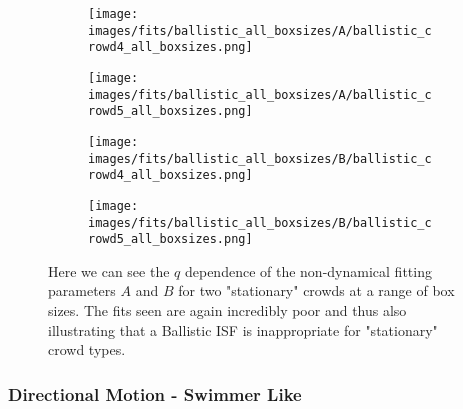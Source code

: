 \documentclass[10pt]{article}
\begin{document}
\begin{figure}[H]
\begin{subfigure}[t]{.5\textwidth}
  \centering
 \texttt{[image: images/fits/ballistic\_all\_boxsizes/A/ballistic\_crowd4\_all\_boxsizes.png]}
  \caption{}
\end{subfigure}%
\hfill
\begin{subfigure}[t]{.5\textwidth}
  \centering
  \texttt{[image: images/fits/ballistic\_all\_boxsizes/A/ballistic\_crowd5\_all\_boxsizes.png]}
  \caption{}
\end{subfigure}
\label{fig:crowd_ballistic_fits_A_all_boxsizes}
\par\bigskip
\begin{subfigure}[t]{.5\textwidth}
  \centering
 \texttt{[image: images/fits/ballistic\_all\_boxsizes/B/ballistic\_crowd4\_all\_boxsizes.png]}
  \caption{}
\end{subfigure}%
\hfill
\begin{subfigure}[t]{.5\textwidth}
  \centering
  \texttt{[image: images/fits/ballistic\_all\_boxsizes/B/ballistic\_crowd5\_all\_boxsizes.png]}
  \caption{}
\end{subfigure}
\caption{Here we can see the $q$ dependence of the non-dynamical fitting parameters $A$ and $B$ for two "stationary" crowds at a range of box sizes. The fits seen are again incredibly poor and thus also illustrating that a Ballistic ISF is inappropriate for "stationary" crowd types.}
\label{fig:crowd_ballistic_fits_tauc_B_boxsizes}
\end{figure}

\subsubsection{Directional Motion - Swimmer Like}
\end{document}
